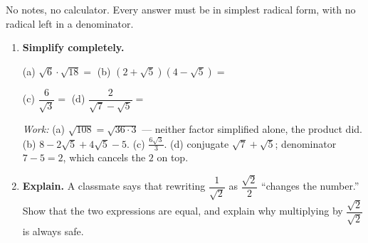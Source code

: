 \documentclass[10pt]{article}
\begin{document}
\namedateperiod

\vspace{0.10in}

No notes, no calculator. Every answer must be in simplest radical form, with no radical left in a
denominator.

\begin{enumerate}[leftmargin=1.8em, itemsep=10pt]
  \item \textbf{Simplify completely.}

        \vspace{4pt}
        (a) $\sqrt{6}\cdot\sqrt{18} = $  \hspace{0.4in}
        (b) $\left(2+\sqrt{5}\right)\left(4-\sqrt{5}\right) = $ 

        \vspace{6pt}
        (c) $\dfrac{6}{\sqrt{3}} = $  \hspace{0.55in}
        (d) $\dfrac{2}{\sqrt{7}-\sqrt{5}} = $ 

        \vspace{2pt}
        {\small\emph{Work:} (a) $\sqrt{108}=\sqrt{36\cdot3}$ --- neither factor simplified alone,
        the product did. \; (b) $8-2\sqrt5+4\sqrt5-5$. \; (c) $\frac{6\sqrt3}{3}$. \;
        (d) conjugate $\sqrt7+\sqrt5$; denominator $7-5=2$, which cancels the $2$ on top.}

  \item \textbf{Explain.} A classmate says that rewriting $\dfrac{1}{\sqrt{2}}$ as
        $\dfrac{\sqrt{2}}{2}$ ``changes the number.'' Show that the two expressions are equal, and
        explain why multiplying by $\dfrac{\sqrt{2}}{\sqrt{2}}$ is always safe.


\end{enumerate}
\end{document}
